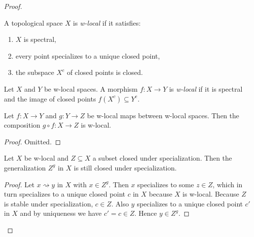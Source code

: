 \begin{proof}
\begin{definition}
    \label{def:w-local-space}
    A topological space \(X\) is \emph{w-local} if it satisfies:
    \begin{enumerate}
        \item \(X\) is spectral,
        \item every point specializes to a unique closed point,
        \item the subspace \(X^c\) of closed points is closed.
    \end{enumerate}
\end{definition}

\begin{definition}
    Let \(X\) and \(Y\) be w-local spaces. A morphism \(f: X \to Y\) is \emph{w-local} if it is spectral and the image of closed points \(f(X^c) \subseteq Y^c\).
    \label{def:w-local-space-map}
    \leanok
\end{definition}

\begin{lemma}
  Let \(f: X \to Y\) and \(g: Y \to Z\) be w-local maps between w-local spaces. Then the composition \(g \circ f: X \to Z\) is w-local.
  \label{thm:w-local-map-composition}
\end{lemma}

\begin{proof}
  Omitted.
\end{proof}

\begin{lemma}
    Let $X$ be w-local and $Z \subseteq X$ a subset closed under specialization. Then the generalization
    $Z^g$ in $X$ is still closed under specialization.
    \label{lemma:generalization-specialization-closed}
\end{lemma}

\begin{proof}
    Let $x \rightsquigarrow y$ in $X$ with $x \in Z^g$. Then $x$ specializes to some $z \in Z$, which
    in turn specializes to a unique closed point $c$ in $X$ because $X$ is w-local.
    Because $Z$ is stable under specialization, $c \in Z$. Also $y$ specializes to a unique closed
    point $c'$ in $X$ and by uniqueness we have $c' = c \in Z$. Hence $y \in Z^g$.
\end{proof}


\end{proof}
